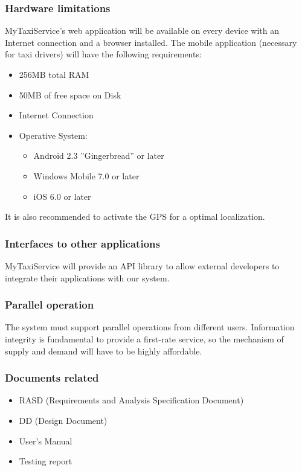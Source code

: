 		\subsubsection{Hardware limitations}
			MyTaxiService's web application will be available on every device with an Internet
			connection and a browser installed. The mobile application (necessary for taxi
			drivers) will have the following requirements:
			\begin{itemize}
				\item 256MB total RAM
				\item 50MB of free space on Disk
				\item Internet Connection
				\item Operative System:
					\begin{itemize}
						\item Android 2.3 ''Gingerbread'' or later
						\item Windows Mobile 7.0 or later
						\item iOS 6.0 or later
					\end{itemize} 
			\end{itemize}
			It is also recommended to activate the GPS for a optimal localization.
		\subsubsection{Interfaces to other applications}
			MyTaxiService will provide an API library to allow external developers to
			integrate their applications with our system.
		\subsubsection{Parallel operation}
			The system must support parallel operations from different users. Information
			integrity is fundamental to provide a first-rate service, so the mechanism of
			supply and demand will have to be highly affordable.
		\subsubsection{Documents related}
			\begin{itemize}
				\item RASD (Requirements and Analysis Specification Document)
				\item DD (Design Document)
				\item User's Manual
				\item Testing report
			\end{itemize}
